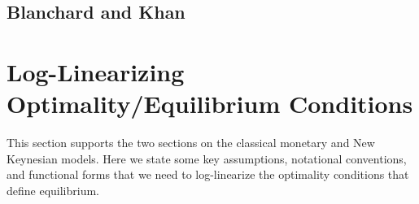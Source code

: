 \documentclass[12pt]{article}
\theoremstyle{plain}
\theoremstyle{definition}
\theoremstyle{remark}
\begin{document}
\clearpage
\subsection{Blanchard and Khan}








\appendix
\clearpage
\section{Log-Linearizing Optimality/Equilibrium Conditions}

This section supports the two sections on the classical monetary and New
Keynesian models.
Here we state some key assumptions, notational conventions, and
functional forms that we need to log-linearize the optimality conditions
that define equilibrium.
\end{document}
